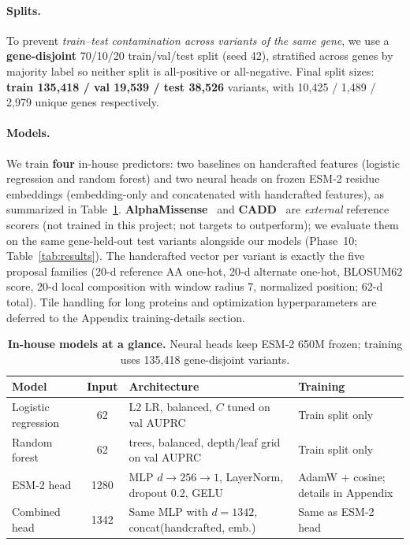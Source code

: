 \documentclass[11pt,letterpaper]{article}
\begin{document}
\paragraph{Splits.}
To prevent \emph{train--test contamination across variants of the same gene}, we use a \textbf{gene-disjoint} 70/10/20 train/val/test split (seed 42), stratified across genes by majority label so neither split is all-positive or all-negative. Final split sizes: \textbf{train 135{,}418 / val 19{,}539 / test 38{,}526} variants, with 10{,}425 / 1{,}489 / 2{,}979 unique genes respectively.

\paragraph{Models.}
We train \textbf{four} in-house predictors: two baselines on handcrafted features (logistic regression and random forest) and two neural heads on frozen ESM-2 residue embeddings (embedding-only and concatenated with handcrafted features), as summarized in Table~\ref{tab:modelzoo}. \textbf{AlphaMissense}~\citep{cheng2023alphamissense} and \textbf{CADD}~\citep{rentzsch2019cadd} are \emph{external} reference scorers (not trained in this project; not targets to outperform); we evaluate them on the same gene-held-out test variants alongside our models (Phase~10; Table~\ref{tab:results}). The handcrafted vector per variant is exactly the five proposal families (20-d reference AA one-hot, 20-d alternate one-hot, BLOSUM62 score, 20-d local composition with window radius 7, normalized position; 62-d total). Tile handling for long proteins and optimization hyperparameters are deferred to the Appendix training-details section.

\begin{table}[t]
\centering
\small
\caption{\textbf{In-house models at a glance.} Neural heads keep ESM-2 650M frozen; training uses 135{,}418 gene-disjoint variants.}
\label{tab:modelzoo}
\begin{tabular}{@{}>{\raggedright\arraybackslash}p{2.8cm}c>{\raggedright\arraybackslash}p{5.8cm}>{\raggedright\arraybackslash}p{4.0cm}@{}}
\toprule
\textbf{Model} & \textbf{Input} & \textbf{Architecture} & \textbf{Training} \\
\midrule
Logistic regression & 62 & L2 LR, balanced, $C$ tuned on val AUPRC & Train split only \\
Random forest & 62 & 500 trees, balanced, depth/leaf grid on val AUPRC & Train split only \\
ESM-2 head & 1280 & MLP $d\to256\to1$, LayerNorm, dropout 0.2, GELU & AdamW + cosine; details in Appendix \\
Combined head & 1342 & Same MLP with $d=1342$, concat(handcrafted, emb.) & Same as ESM-2 head \\
\bottomrule
\end{tabular}
\end{table}
\end{document}

